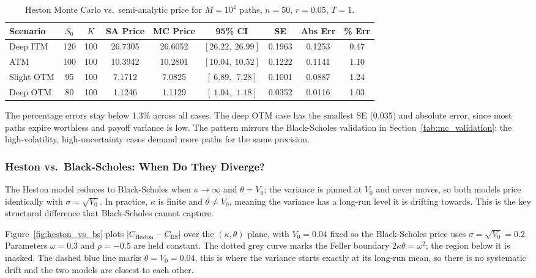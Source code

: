 \documentclass[a4paper,11pt, titlepage]{article}
\theoremstyle{definition}
\theoremstyle{plain}
\theoremstyle{remark}
\begin{document}
\begin{table}[htbp]
\centering
\caption{Heston Monte Carlo vs.\ semi-analytic price for $M=10^4$ paths, $n=50$, $r=0.05$, $T=1$.}
\label{tab:heston_validation}
\begin{tabular}{lcccccccc}
\toprule
Scenario & $S_0$ & $K$ & SA Price & MC Price & 95\% CI & SE & Abs Err & \% Err \\
\midrule
Deep ITM    & 120 & 100 & 26.7305 & 26.6052 & $[26.22,\ 26.99]$ & 0.1963 & 0.1253 & 0.47 \\
ATM         & 100 & 100 & 10.3942 & 10.2801 & $[10.04,\ 10.52]$ & 0.1222 & 0.1141 & 1.10 \\
Slight OTM  &  95 & 100 &  7.1712 &  7.0825 & $[\ 6.89,\ \ 7.28]$ & 0.1001 & 0.0887 & 1.24 \\
Deep OTM    &  80 & 100 &  1.1246 &  1.1129 & $[\ 1.04,\ \ 1.18]$ & 0.0352 & 0.0116 & 1.03 \\
\bottomrule
\end{tabular}
\end{table}

The percentage errors stay below 1.3\% across all cases. The deep OTM case has the smallest SE (0.035) and absolute error, since most paths expire worthless and payoff variance is low. The pattern mirrors the Black-Scholes validation in Section~\ref{tab:mc_validation}: the high-volatility, high-uncertainty cases demand more paths for the same precision.

\FloatBarrier

\subsubsection{Heston vs.\ Black-Scholes: When Do They Diverge?}

The Heston model reduces to Black-Scholes when $\kappa \to \infty$ and $\theta = V_0$; the variance is pinned at $V_0$ and never moves, so both models price identically with $\sigma = \sqrt{V_0}$. In practice, $\kappa$ is finite and $\theta \neq V_0$, meaning the variance has a long-run level it is drifting towards. This is the key structural difference that Black-Scholes cannot capture.

Figure~\ref{fig:heston_vs_bs} plots $|C_{\text{Heston}} - C_{\text{BS}}|$ over the $(\kappa, \theta)$ plane, with $V_0 = 0.04$ fixed so the Black-Scholes price uses $\sigma = \sqrt{V_0} = 0.2$. Parameters $\omega = 0.3$ and $\rho = -0.5$ are held constant. The dotted grey curve marks the Feller boundary $2\kappa\theta = \omega^2$; the region below it is masked. The dashed blue line marks $\theta = V_0 = 0.04$, this is where the variance starts exactly at its long-run mean, so there is no systematic drift and the two models are closest to each other.
\end{document}
